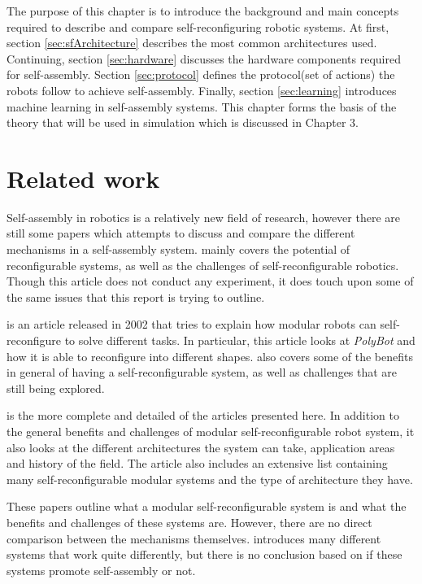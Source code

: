

The purpose of this chapter is to introduce the background and main concepts required to describe and compare self-reconfiguring robotic systems.
At first, section \ref{sec:sfArchitecture} describes the most common architectures used.
Continuing, section \ref{sec:hardware} discusses the hardware components required for self-assembly.
Section \ref{sec:protocol} defines the protocol(set of actions) the robots follow to achieve self-assembly.
Finally, section \ref{sec:learning} introduces machine learning in self-assembly systems.
This chapter forms the basis of the theory that will be used in simulation which is discussed in Chapter 3.

\section{Related work}
Self-assembly in robotics is a relatively new field of research, however there are still some papers which attempts to discuss and compare the different mechanisms in a self-assembly system. 
\cite{murata_self-reconfigurable_2007} mainly covers the potential of reconfigurable systems, as well as the challenges of self-reconfigurable robotics. 
Though this article does not conduct any experiment, it does touch upon some of the same issues that this report is trying to outline.

\cite{yim_modular_2002} is an article released in 2002 that tries to explain how modular robots can self-reconfigure to solve different tasks. 
In particular, this article looks at \emph{PolyBot} and how it is able to reconfigure into different shapes. 
\cite{yim_modular_2002} also covers some of the benefits in general of having a self-reconfigurable system, as well as challenges that are still being explored.

\cite{yim_modular_2007} is the more complete and detailed of the articles presented here. 
In addition to the general benefits and challenges of modular self-reconfigurable robot system, it also looks at the different architectures the system can take, application areas and history of the field.
The article also includes an extensive list containing many self-reconfigurable modular systems and the type of architecture they have.

These papers outline what a modular self-reconfigurable system is and what the benefits and challenges of these systems are.
However, there are no direct comparison between the mechanisms themselves.
\cite{yim_modular_2007} introduces many different systems that work quite differently, but there is no conclusion based on if  these systems promote self-assembly or not.

